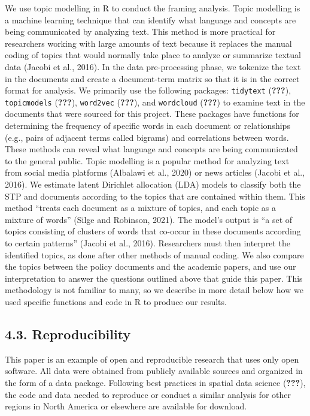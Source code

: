\documentclass[]{elsarticle} %
\begin{document}
We use topic modelling in R to conduct the framing analysis. Topic
modelling is a machine learning technique that can identify what
language and concepts are being communicated by analyzing text. This
method is more practical for researchers working with large amounts of
text because it replaces the manual coding of topics that would normally
take place to analyze or summarize textual data (Jacobi et al., 2016).
In the data pre-processing phase, we tokenize the text in the documents
and create a document-term matrix so that it is in the correct format
for analysis. We primarily use the following packages: \texttt{tidytext}
({\textbf{???}}), \texttt{topicmodels} ({\textbf{???}}),
\texttt{word2vec} ({\textbf{???}}), and \texttt{wordcloud}
({\textbf{???}}) to examine text in the documents that were sourced for
this project. These packages have functions for determining the
frequency of specific words in each document or relationships (e.g.,
pairs of adjacent terms called bigrams) and correlations between words.
These methods can reveal what language and concepts are being
communicated to the general public. Topic modelling is a popular method
for analyzing text from social media platforms (Albalawi et al., 2020)
or news articles (Jacobi et al., 2016). We estimate latent Dirichlet
allocation (LDA) models to classify both the STP and documents according
to the topics that are contained within them. This method ``treats each
document as a mixture of topics, and each topic as a mixture of words''
(Silge and Robinson, 2021). The model's output is ``a set of topics
consisting of clusters of words that co-occur in these documents
according to certain patterns'' (Jacobi et al., 2016). Researchers must
then interpret the identified topics, as done after other methods of
manual coding. We also compare the topics between the policy documents
and the academic papers, and use our interpretation to answer the
questions outlined above that guide this paper. This methodology is not
familiar to many, so we describe in more detail below how we used
specific functions and code in R to produce our results.

\hypertarget{reproducibility}{%
\subsection{4.3. Reproducibility}\label{reproducibility}}

This paper is an example of open and reproducible research that uses
only open software. All data were obtained from publicly available
sources and organized in the form of a data package. Following best
practices in spatial data science ({\textbf{???}}), the code and data
needed to reproduce or conduct a similar analysis for other regions in
North America or elsewhere are available for download.
\end{document}
